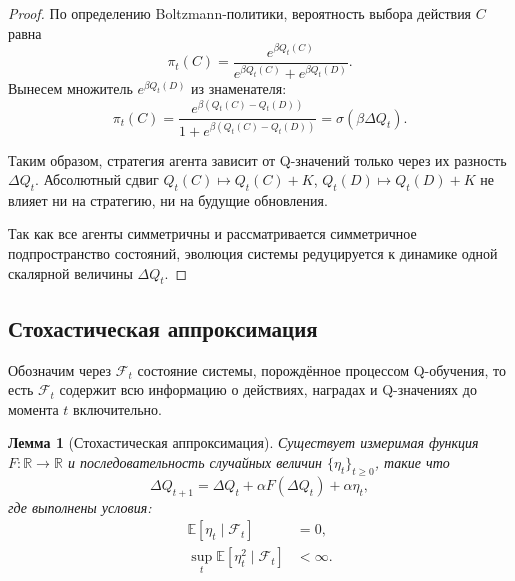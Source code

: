 \documentclass[12pt,a4paper]{article}
\newtheorem{lemma}{Лемма}
\theoremstyle{definition}
\begin{document}
\begin{proof}
По определению Boltzmann-политики,
вероятность выбора действия $C$ равна
\[
\pi_t(C)
=
\frac{e^{\beta Q_t(C)}}
{e^{\beta Q_t(C)} + e^{\beta Q_t(D)}}.
\]
Вынесем множитель $e^{\beta Q_t(D)}$ из знаменателя:
\[
\pi_t(C)
=
\frac{e^{\beta (Q_t(C)-Q_t(D))}}
{1 + e^{\beta (Q_t(C)-Q_t(D))}}
=
\sigma(\beta \Delta Q_t).
\]

Таким образом, стратегия агента зависит от Q-значений
только через их разность $\Delta Q_t$.
Абсолютный сдвиг
$Q_t(C)\mapsto Q_t(C)+K$, $Q_t(D)\mapsto Q_t(D)+K$
не влияет ни на стратегию, ни на будущие обновления.

Так как все агенты симметричны и рассматривается
симметричное подпространство состояний,
эволюция системы редуцируется
к динамике одной скалярной величины $\Delta Q_t$.
\end{proof}

\subsection{Стохастическая аппроксимация}

Обозначим через $\mathcal{F}_t$
состояние системы, порождённое процессом Q-обучения,
то есть $\mathcal{F}_t$ содержит всю информацию
о действиях, наградах и Q-значениях до момента $t$ включительно.

\begin{lemma}[Стохастическая аппроксимация]
\label{lem:sa}
Существует измеримая функция $F:\mathbb{R}\to\mathbb{R}$
и последовательность случайных величин $\{\eta_t\}_{t\ge 0}$,
такие что
\[
\Delta Q_{t+1}
=
\Delta Q_t + \alpha F(\Delta Q_t) + \alpha \eta_t,
\]
где выполнены условия:
\begin{align*}
\mathbb{E}[\eta_t \mid \mathcal{F}_t] &= 0,\\
\sup_{t} \mathbb{E}[\eta_t^2 \mid \mathcal{F}_t] &< \infty.
\end{align*}
\end{lemma}
\end{document}
